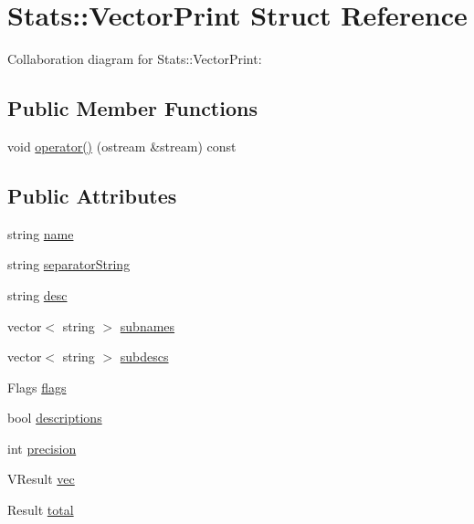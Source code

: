 \hypertarget{structStats_1_1VectorPrint}{
\section{Stats::VectorPrint Struct Reference}
\label{structStats_1_1VectorPrint}
}


Collaboration diagram for Stats::VectorPrint:
\subsection*{Public Member Functions}
\begin{DoxyCompactItemize}
\item 
void \hyperlink{structStats_1_1VectorPrint_a68ba1f354848bef75b688af324b9179c}{operator()} (ostream \&stream) const 
\end{DoxyCompactItemize}
\subsection*{Public Attributes}
\begin{DoxyCompactItemize}
\item 
string \hyperlink{structStats_1_1VectorPrint_aa1c8b85457fa70786c79d0196cffb548}{name}
\item 
string \hyperlink{structStats_1_1VectorPrint_a61e9ebc60bf9485f5a28c6b7fa0dcb88}{separatorString}
\item 
string \hyperlink{structStats_1_1VectorPrint_abf91a47332e2e5d565e16c24b92b5988}{desc}
\item 
vector$<$ string $>$ \hyperlink{structStats_1_1VectorPrint_a584fa8575a02b844676d7dac1f99b8d5}{subnames}
\item 
vector$<$ string $>$ \hyperlink{structStats_1_1VectorPrint_ad41b5952812a233f57034740cd6193e2}{subdescs}
\item 
Flags \hyperlink{structStats_1_1VectorPrint_a560393c8e7059f844bc7045d863df2f5}{flags}
\item 
bool \hyperlink{structStats_1_1VectorPrint_a8f833bcb63a2f90b369553a62e2b42ce}{descriptions}
\item 
int \hyperlink{structStats_1_1VectorPrint_a944b839b2d16ab471f66013d6e543b26}{precision}
\item 
VResult \hyperlink{structStats_1_1VectorPrint_a0c73337c9840ea8e285fd5fbebaf90b1}{vec}
\item 
Result \hyperlink{structStats_1_1VectorPrint_a739c34030fdd6f5dfcc4df58420a4e9f}{total}
\end{DoxyCompactItemize}


